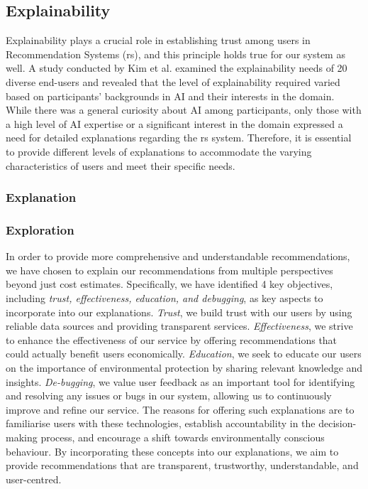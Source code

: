 \subsection{Explainability}

Explainability plays a crucial role in establishing trust among users in Recommendation Systems (\gls{rs}), and this principle holds true for our system as well. 
A study conducted by Kim et al. \cite{xai4endusers} examined the explainability needs of 20 diverse end-users 
and revealed that the level of explainability required varied based on participants' backgrounds in AI and their interests in the domain. 
While there was a general curiosity about AI among participants, only those with a high level of AI expertise or a significant interest in the domain expressed a need for detailed explanations regarding the \gls{rs} system. 
Therefore, it is essential to provide different levels of explanations to accommodate the varying characteristics of users and meet their specific needs. 

\subsubsection{Explanation}

\subsubsection{Exploration}

In order to provide more comprehensive and understandable recommendations, we have chosen to explain our recommendations from multiple perspectives beyond just cost estimates. 
Specifically, we have identified 4 key objectives, including \emph{trust, effectiveness, education, and debugging}, as key aspects to incorporate into our explanations. 
\emph{Trust}, we build trust with our users by using reliable data sources and providing transparent services. 
\emph{Effectiveness}, we strive to enhance the effectiveness of our service by offering recommendations that could actually benefit users economically. 
\emph{Education}, we seek to educate our users on the importance of environmental protection by sharing relevant knowledge and insights. 
\emph{De-bugging}, we value user feedback as an important tool for identifying and resolving any issues or bugs in our system, allowing us to continuously improve and refine our service.
The reasons for offering such explanations are to familiarise users with these technologies, establish accountability in the decision-making process, and encourage a shift towards environmentally conscious behaviour.
By incorporating these concepts into our explanations, we aim to provide recommendations that are transparent, trustworthy, understandable, and user-centred. 

